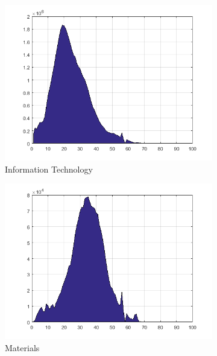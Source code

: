\documentclass[11pt,a4,twosided,singlespacing,titlepagenumber=on]{scrreprt}
\numberwithin{equation}{chapter} %
\theoremstyle{remark}
\begin{document}
\begin{figure}[H]
\begin{subfigure}[t]{0.23\textwidth}
        \includegraphics[width=1\textwidth]{quad/7}
        \caption{Information Technology}
    \end{subfigure}
    \begin{subfigure}[t]{0.23\textwidth}
        \centering
        \includegraphics[width=1\textwidth]{quad/8}
        \caption{Materials}
    \end{subfigure}
    \begin{subfigure}[t]{0.23\textwidth}
        \centering

\end{subfigure}
\end{figure}
\end{document}
